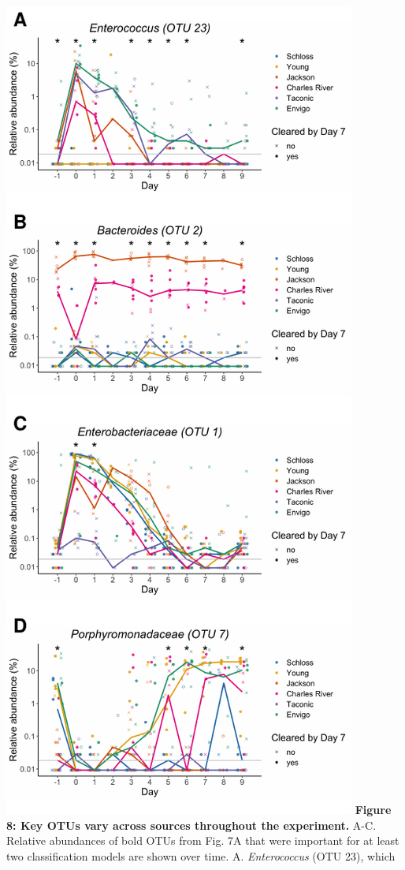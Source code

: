 \documentclass[11pt,]{article}
\begin{document}
\includegraphics{figure_8.pdf} \textbf{Figure 8: Key OTUs vary across
sources throughout the experiment.} A-C. Relative abundances of bold
OTUs from Fig. 7A that were important for at least two classification
models are shown over time. A. \emph{Enterococcus} (OTU 23), which
\end{document}
